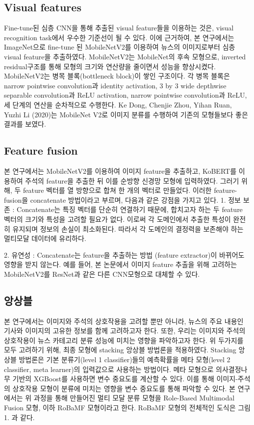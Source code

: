 \documentclass{article}
\begin{document}
\subsection{Visual features}
Fine-tune된 심층 CNN을 통해 추출된 visual feature들을 이용하는 것은, visual recognition task에서 우수한 기준선이 될 수 있다\cite{sharif2014cnn}.
이에 근거하여, 본 연구에서는 ImageNet으로 fine-tune 된 MobileNetV2를 이용하여 뉴스의 이미지로부터 심층 visual feature을 추출하였다.
MobileNetV2는 MobileNet의 후속 모형으로, inverted residual구조를 통해 모형의 크기와 연산량을 줄이면서 성능을 향상시켰다.
MobileNetV2는 병목 블록(bottleneck block)이 쌓인 구조이다. 각 병목 블록은 narrow pointwise convolution과 identity activation, 3 by 3 wide depthwise separable convolution과 ReLU activation, narrow pointwise convolution과 ReLU, 세 단계의 연산을 순차적으로 수행한다.
Ke Dong, Chenjie Zhou, Yihan Ruan, Yuzhi Li (2020)는 MobileNet V2로 이미지 분류를 수행하여 기존의 모형들보다 좋은 결과를 보였다\cite{dong2020mobilenetv2}.

\subsection{Feature fusion}
본 연구에서는 MobileNetV2를 이용하여 이미지 feature을 추출하고, KoBERT를 이용하여 주석의 feature을 추출한 뒤 이를 순방향 신경망 모형에 입력하였다. 그러기 위해, 두 feature 벡터를 열 방향으로 합쳐 한 개의 벡터로 만들었다.
이러한 feature-fusion을 concatenate 방법이라고 부르며, 다음과 같은 강점을 가지고 있다.
1. 정보 보존 : Concatenate는 특징 벡터를 단순히 연결하기 때문에, 합치고자 하는 두 feature 벡터의 크기와 특성을 고려할 필요가 없다. 이로써 각 도메인에서 추출한 특성이 완전히 유지되며 정보의 손실이 최소화된다. 따라서 각 도메인의 결정력을 보존해야 하는 멀티모달 데이터에 유리하다.
 
2. 유연성 : Concatenate는 feature을 추출하는 방법 (feature extractor)이 바뀌어도 영향을 받지 않는다. 예를 들어, 본 논문에서 이미지 feature 추출을 위해 고려하는 MobileNetV2를 ResNet과 같은 다른 CNN모형으로 대체할 수 있다.

\subsection{앙상블}
본 연구에서는 이미지와 주석의 상호작용을 고려할 뿐만 아니라, 뉴스의 주요 내용인 기사와 이미지의 고유한 정보를 함께 고려하고자 한다.
또한, 우리는 이미지와 주석의 상호작용이 뉴스 카테고리 분류 성능에 미치는 영향을 파악하고자 한다.
위 두가지를 모두 고려하기 위해, 최종 모형에 stacking 앙상블 방법론을 적용하였다.
 Stacking 앙상블 방법론은 기본 분류기(level 1 classifier)들의 예측확률을 메타 모형(level 2 classifier, meta learner)의 입력값으로 사용하는 방법이다. 메타 모형으로 의사결정나무 기반의 XGBoost를 사용하면 변수 중요도를 계산할 수 있다. 이를 통해 이미지-주석의 상호작용 모형이 분류에 미치는 영향을 변수 중요도를 통해 파악할 수 있다.
본 연구에서는 위 과정을 통해 만들어진 멀티 모달 분류 모형을 Role-Based Multimodal Fusion 모형, 이하 RoBaMF 모형이라고 한다. RoBaMF 모형의 전체적인 도식은 그림 1. 과 같다.
\end{document}
